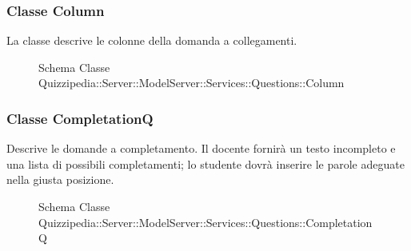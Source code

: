 \subsubsection{Classe Column}
La classe descrive le colonne della domanda a collegamenti.
\begin{figure}[H]
\centering
\noindent{}
\caption[Schema Classe Column]{Schema Classe Quizzipedia::Server::ModelServer::Services::Questions::Column}
\end{figure}
\subsubsection{Classe CompletationQ}
Descrive le domande a completamento. Il docente fornirà un testo incompleto e una lista di possibili completamenti; lo studente dovrà inserire le parole adeguate nella giusta posizione.
\begin{figure}[H]
\centering
\noindent{}
\caption[Schema Classe CompletationQ]{Schema Classe Quizzipedia::Server::ModelServer::Services::Questions::CompletationQ}
\end{figure}
